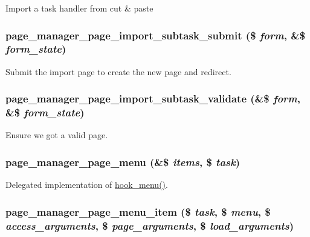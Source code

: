 \label{page_8admin_8inc_a506bcc1dfa1fd86e2cfe581842e54e30}
Import a task handler from cut \& paste \hypertarget{page_8admin_8inc_ab8bec4270961943c7ed320ee9d6fb45e}{
\subsubsection[{page\_\-manager\_\-page\_\-import\_\-subtask\_\-submit}]{\setlength{\rightskip}{0pt plus 5cm}page\_\-manager\_\-page\_\-import\_\-subtask\_\-submit (\$ {\em form}, \/  \&\$ {\em form\_\-state})}}
\label{page_8admin_8inc_ab8bec4270961943c7ed320ee9d6fb45e}
Submit the import page to create the new page and redirect. \hypertarget{page_8admin_8inc_ae5d65999777c0cd66feb5baa3ef6d16d}{
\subsubsection[{page\_\-manager\_\-page\_\-import\_\-subtask\_\-validate}]{\setlength{\rightskip}{0pt plus 5cm}page\_\-manager\_\-page\_\-import\_\-subtask\_\-validate (\&\$ {\em form}, \/  \&\$ {\em form\_\-state})}}
\label{page_8admin_8inc_ae5d65999777c0cd66feb5baa3ef6d16d}
Ensure we got a valid page. \hypertarget{page_8admin_8inc_a8be2096539f5a1536297131eda4ca631}{
\subsubsection[{page\_\-manager\_\-page\_\-menu}]{\setlength{\rightskip}{0pt plus 5cm}page\_\-manager\_\-page\_\-menu (\&\$ {\em items}, \/  \$ {\em task})}}
\label{page_8admin_8inc_a8be2096539f5a1536297131eda4ca631}
Delegated implementation of \hyperlink{group__hooks_ga5c95244fea59b25666e409759e133ded}{hook\_\-menu()}. \hypertarget{page_8admin_8inc_a649d45ee42b5d2c2541a994585495c38}{
\subsubsection[{page\_\-manager\_\-page\_\-menu\_\-item}]{\setlength{\rightskip}{0pt plus 5cm}page\_\-manager\_\-page\_\-menu\_\-item (\$ {\em task}, \/  \$ {\em menu}, \/  \$ {\em access\_\-arguments}, \/  \$ {\em page\_\-arguments}, \/  \$ {\em load\_\-arguments})}}
